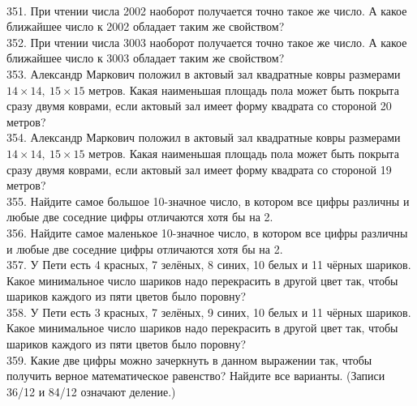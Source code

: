 \documentclass[12pt]{article}
\begin{document}
\begin{figure}[ht!]
\end{figure}\\
351. При чтении числа 2002 наоборот получается точно такое же число. А какое ближайшее число к 2002 обладает таким же свойством?\\
352. При чтении числа 3003 наоборот получается точно такое же число. А какое ближайшее число
к 3003 обладает таким же свойством?\\
353. Александр Маркович положил в актовый зал квадратные ковры размерами $14 \times 14,\ 15 \times 15$ метров. Какая наименьшая площадь пола может быть покрыта сразу двумя коврами, если актовый зал имеет форму квадрата со стороной 20 метров?\\
354. Александр Маркович положил в актовый зал квадратные ковры размерами $14 \times 14,\ 15 \times 15$ метров. Какая наименьшая площадь пола может быть покрыта сразу двумя коврами, если актовый зал имеет форму квадрата со стороной 19 метров?\\
355. Найдите самое большое 10-значное число, в котором все цифры различны и любые две соседние цифры отличаются хотя бы на 2.\\
356. Найдите самое маленькое 10-значное число, в котором все цифры различны и любые две соседние цифры отличаются хотя бы на 2.\\
357. У Пети есть 4 красных, 7 зелёных, 8 синих, 10 белых и 11 чёрных шариков. Какое минимальное число шариков надо перекрасить в другой цвет так, чтобы шариков каждого из пяти цветов было поровну?\\
358. У Пети есть 3 красных, 7 зелёных, 9 синих, 10 белых и 11 чёрных шариков. Какое минимальное число шариков надо перекрасить в другой цвет так, чтобы шариков каждого из пяти цветов было поровну?\\
359. Какие две цифры можно зачеркнуть в данном выражении так, чтобы получить верное математическое равенство? Найдите все варианты. (Записи 36/12 и 84/12 означают деление.)
\end{document}
